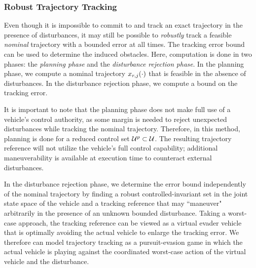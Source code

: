 \subsubsection{Robust Trajectory Tracking\label{sec:rtt}}
Even though it is impossible to commit to and track an exact trajectory in the presence of disturbances, it may still be possible to \textit{robustly} track a feasible \textit{nominal} trajectory with a bounded error at all times. The tracking error bound can be used to determine the induced obstacles. Here, computation is done in two phases: the \textit{planning phase} and the \textit{disturbance rejection phase}. In the planning phase, we compute a nominal trajectory $x_{r,j}(\cdot)$ that is feasible in the absence of disturbances. In the disturbance rejection phase, we compute a bound on the tracking error.%

It is important to note that the planning phase does not make full use of a vehicle's control authority, as some margin is needed to reject unexpected disturbances while tracking the nominal trajectory. Therefore, in this method, planning is done for a reduced control set $\mathcal{U}^p\subset\mathcal{U}$. The resulting trajectory reference will not utilize the vehicle's full control capability; additional maneuverability is available at execution time to counteract external disturbances.

In the disturbance rejection phase, we determine the error bound independently of the nominal trajectory by finding a robust controlled-invariant set in the joint state space of the vehicle and a tracking reference that may ``maneuver" arbitrarily in the presence of an unknown bounded disturbance. Taking a worst-case approach, the tracking reference can be viewed as a virtual evader vehicle that is optimally avoiding the actual vehicle to enlarge the tracking error. We therefore can model trajectory tracking as a pursuit-evasion game in which the actual vehicle is playing against the coordinated worst-case action of the virtual vehicle and the disturbance. %


